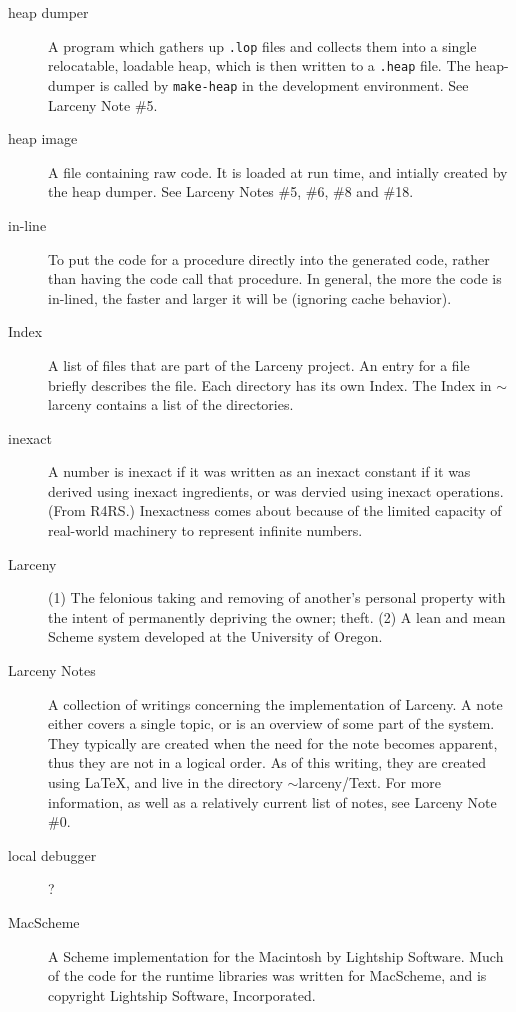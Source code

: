 \begin{description}
\item[heap dumper]
A program which gathers up {\tt .lop} files and collects them into a 
single relocatable, loadable heap, which is then written to a 
{\tt .heap} file.  The heap-dumper is called by {\tt make-heap}
in the development environment.  See Larceny Note \#5.

\item[heap image]
A file containing raw code.  It is loaded at run time, and
intially created by the heap dumper.
See Larceny Notes \#5, \#6, \#8 and \#18.

\item[in-line]
To put the code for a procedure directly into the generated code, rather
than having the code call that procedure.  In general, the more the
code is in-lined, the faster and larger it will be (ignoring cache
behavior).

\item[Index]
A list of files that are part of the Larceny project.  An entry for
a file briefly describes the file.  Each directory has its own Index.
  The Index in $\sim$larceny contains a list of the directories. 

\item[inexact]
A number is inexact if it was written as an inexact constant if it was
derived using inexact ingredients, or was dervied using inexact operations.
(From R4RS.)  Inexactness comes about because of the limited capacity
of real-world machinery to represent infinite numbers.

\item[Larceny]
(1) The felonious taking and removing of another's 
personal property with the intent of permanently depriving the owner; theft.
(2) A lean and mean Scheme system developed at the University of Oregon.

\item[Larceny Notes]
A collection of writings concerning the implementation of Larceny.
A note either covers a single topic, or is an overview of some
part of the system.  They typically are created when the need for
the note becomes apparent, thus they are not in a logical order.  
As of this writing, they are created using \LaTeX, and live in the
directory $\sim$larceny/Text. For more information, as well as
a relatively current list of notes, see Larceny Note \#0.

\item[local debugger]
?

\item[MacScheme]  
A Scheme implementation for the Macintosh by Lightship Software.  
Much of the code for the runtime libraries was written for MacScheme, 
and is copyright Lightship Software, Incorporated.


\end{description}
